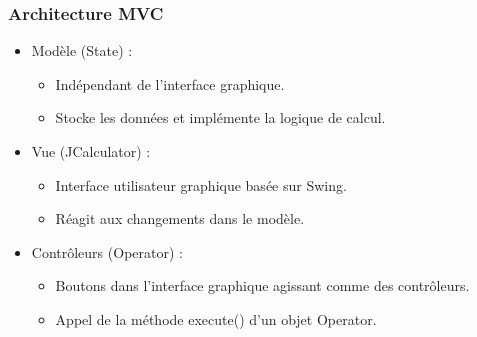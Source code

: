 \documentclass[12pt]{report}
\begin{document}
                \subsubsection*{Architecture MVC}
                    \begin{itemize}
                        \item Modèle (State) :
                        \begin{itemize}
                            \item Indépendant de l’interface graphique.
                            \item Stocke les données et implémente la logique de calcul.
                        \end{itemize}

                        \item Vue (JCalculator) :
                        \begin{itemize}
                            \item Interface utilisateur graphique basée sur Swing.
                            \item Réagit aux changements dans le modèle.
                        \end{itemize}

                        \item Contrôleurs (Operator) :
                        \begin{itemize}
                            \item Boutons dans l’interface graphique agissant comme des contrôleurs.
                            \item Appel de la méthode execute() d’un objet Operator.
                        \end{itemize}
                    \end{itemize}
\end{document}

